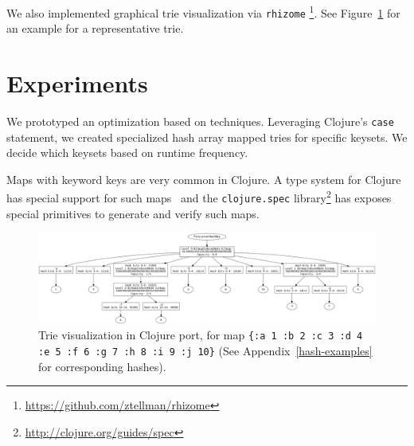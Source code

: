 \documentclass[preprint]{sigplanconf}
\begin{document}
We also implemented graphical trie visualization 
via \texttt{rhizome}
\footnote{\url{https://github.com/ztellman/rhizome}}.
See Figure~\ref{big-trie-vis} for an example
for a representative trie.

\section{Experiments}
\label{experiments}

We prototyped an optimization based on
 techniques.
Leveraging Clojure's \texttt{case} statement,
we created specialized hash array mapped tries
for specific keysets.
We decide which keysets based on runtime frequency.

Maps with keyword keys are very common in Clojure.
A type system for Clojure has special support
for such maps~\cite{bonnaire2016practical}
and the \texttt{clojure.spec} library\footnote{\url{http://clojure.org/guides/spec}}
has exposes special primitives to generate and verify
such maps.

%
%
%

\begin{figure}
\includegraphics[width=18cm]{big-tree}
\caption{
Trie visualization in Clojure port, for map
\texttt{\{:a 1 :b 2 :c 3 :d 4 :e 5 :f 6 :g 7 :h 8 :i 9 :j 10\}}
(See Appendix~\ref{hash-examples} for corresponding hashes).
}
\label{big-trie-vis}
\end{figure}
\end{document}
